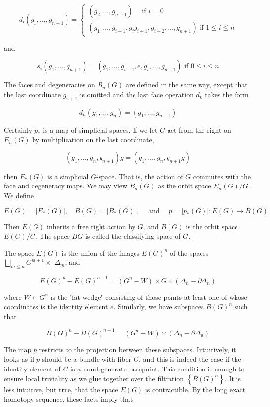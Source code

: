 $$
d_i\left(g_1, \ldots, g_{n+1}\right)=\left\{\begin{array}{l}
\left(g_2, \ldots, g_{n+1}\right) \quad \text { if } i=0 \\
\left(g_1, \ldots, g_{i-1}, g_i g_{i+1}, g_{i+2}, \ldots, g_{n+1}\right) \text { if } 1 \leq i \leq n
\end{array}\right.
$$

and

$$
s_i\left(g_1, \ldots, g_{n+1}\right)=\left(g_1, \ldots, g_{i-1}, e, g_i, \ldots, g_{n+1}\right) \text { if } 0 \leq i \leq n
$$


The faces and degeneracies on $B_n(G)$ are defined in the same way, except that the last coordinate $g_{n+1}$ is omitted and the last face operation $d_n$ takes the form

$$
d_n\left(g_1, \ldots, g_n\right)=\left(g_1, \ldots, g_{n-1}\right)
$$


Certainly $p_*$ is a map of simplicial spaces. If we let $G$ act from the right on $E_n(G)$ by multiplication on the last coordinate,

$$
\left(g_1, \ldots, g_n, g_{n+1}\right) g=\left(g_1, \ldots, g_n, g_{n+1} g\right)
$$

then $E_*(G)$ is a simplicial $G$-space. That is, the action of $G$ commutes with the face and degeneracy maps. We may view $B_n(G)$ as the orbit space $E_n(G) / G$. We define

$$
E(G)=\left|E_*(G)\right|, \quad B(G)=\left|B_*(G)\right|, \quad \text { and } \quad p=\left|p_*(G)\right|: E(G) \longrightarrow B(G)
$$


Then $E(G)$ inherits a free right action by $G$, and $B(G)$ is the orbit space $E(G) / G$. The space $B G$ is called the classifying space of $G$.

The space $E(G)$ is the union of the images $E(G)^n$ of the spaces $\bigsqcup_{m \leq n} G^{m+1} \times$ $\Delta_m$, and

$$
E(G)^n-E(G)^{n-1}=\left(G^n-W\right) \times G \times\left(\Delta_n-\partial \Delta_n\right)
$$

where $W \subset G^n$ is the "fat wedge" consisting of those points at least one of whose coordinates is the identity element $e$. Similarly, we have subspaces $B(G)^n$ such that

$$
B(G)^n-B(G)^{n-1}=\left(G^n-W\right) \times\left(\Delta_n-\partial \Delta_n\right)
$$


The map $p$ restricts to the projection between these subspaces. Intuitively, it looks as if $p$ should be a bundle with fiber $G$, and this is indeed the case if the identity element of $G$ is a nondegenerate basepoint. This condition is enough to ensure local triviality as we glue together over the filtration $\left\{B(G)^n\right\}$. It is less intuitive, but true, that the space $E(G)$ is contractible. By the long exact homotopy sequence, these facts imply that

